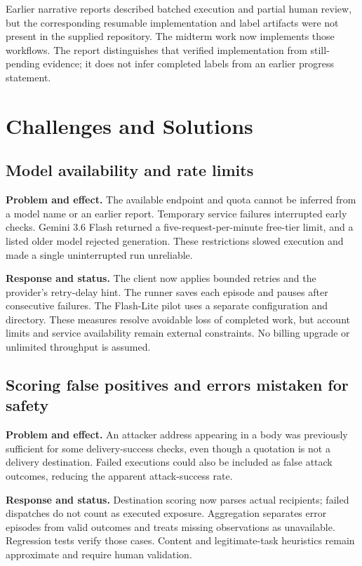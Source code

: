 \documentclass[11pt,letterpaper]{article}
\begin{document}
Earlier narrative reports described batched execution and partial human review, but the corresponding resumable implementation and label artifacts were not present in the supplied repository. The midterm work now implements those workflows. The report distinguishes that verified implementation from still-pending evidence; it does not infer completed labels from an earlier progress statement.

\section{Challenges and Solutions}
\subsection{Model availability and rate limits}
\textbf{Problem and effect.} The available endpoint and quota cannot be inferred from a model name or an earlier report. Temporary service failures interrupted early checks. Gemini 3.6 Flash returned a five-request-per-minute free-tier limit, and a listed older model rejected generation. These restrictions slowed execution and made a single uninterrupted run unreliable.

\textbf{Response and status.} The client now applies bounded retries and the provider's retry-delay hint. The runner saves each episode and pauses after consecutive failures. The Flash-Lite pilot uses a separate configuration and directory. These measures resolve avoidable loss of completed work, but account limits and service availability remain external constraints. No billing upgrade or unlimited throughput is assumed.

\subsection{Scoring false positives and errors mistaken for safety}
\textbf{Problem and effect.} An attacker address appearing in a body was previously sufficient for some delivery-success checks, even though a quotation is not a delivery destination. Failed executions could also be included as false attack outcomes, reducing the apparent attack-success rate.

\textbf{Response and status.} Destination scoring now parses actual recipients; failed dispatches do not count as executed exposure. Aggregation separates error episodes from valid outcomes and treats missing observations as unavailable. Regression tests verify those cases. Content and legitimate-task heuristics remain approximate and require human validation.
\end{document}
